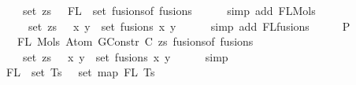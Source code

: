 \begin{isabellebody}
\ \ \ \ \ set\ zs\ {\isasymunion}\ {\isasymUnion}\ {\isacharparenleft}{\kern0pt}FL\ {\isacharbackquote}{\kern0pt}\ set\ {\isacharparenleft}{\kern0pt}fusions{\isacharunderscore}{\kern0pt}of\ fusions{\isacharparenright}{\kern0pt}{\isacharparenright}{\kern0pt}{\isachardoublequoteclose}\isanewline
\ \ \ \ \isamarkupfalse%
\ {\isacharparenleft}{\kern0pt}simp\ add{\isacharcolon}{\kern0pt}\ FL{\isacharunderscore}{\kern0pt}Mols{}{\isacharparenright}{\kern0pt}\isanewline
\ \ \isamarkupfalse%
\ \isamarkupfalse%
\isanewline
\ \ \ \ {\isachardoublequoteopen}{\isachardot}{\kern0pt}{\isachardot}{\kern0pt}{\isachardot}{\kern0pt}\ {\isacharequal}{\kern0pt}\ set\ zs\ {\isasymunion}\ {\isacharparenleft}{\kern0pt}{\isasymUnion}\ {\isacharparenleft}{\kern0pt}x{\isacharcomma}{\kern0pt}\ y{\isacharparenright}{\kern0pt}\ {\isasymin}\ set\ fusions{\isachardot}{\kern0pt}\ {\isacharbraceleft}{\kern0pt}x{\isacharcomma}{\kern0pt}\ y{\isacharbraceright}{\kern0pt}{\isacharparenright}{\kern0pt}{\isachardoublequoteclose}\isanewline
\ \ \ \ \isamarkupfalse%
\ {\isacharparenleft}{\kern0pt}simp\ add{\isacharcolon}{\kern0pt}\ FL{\isacharunderscore}{\kern0pt}fusions{\isacharparenright}{\kern0pt}\isanewline
\ \ \isamarkupfalse%
\ \isamarkupfalse%
\ P{}{}{\isacharcolon}{\kern0pt}\isanewline
\ \ \ \ {\isachardoublequoteopen}FL\ {\isacharparenleft}{\kern0pt}Mols{}\ {\isacharparenleft}{\kern0pt}Atom\ {\isacharparenleft}{\kern0pt}GConstr\ C{\isacharparenright}{\kern0pt}\ zs{\isacharparenright}{\kern0pt}\ {\isacharparenleft}{\kern0pt}fusions{\isacharunderscore}{\kern0pt}of\ fusions{\isacharparenright}{\kern0pt}{\isacharparenright}{\kern0pt}\ {\isacharequal}{\kern0pt}\isanewline
\ \ \ \ \ set\ zs\ {\isasymunion}\ {\isacharparenleft}{\kern0pt}{\isasymUnion}\ {\isacharparenleft}{\kern0pt}x{\isacharcomma}{\kern0pt}\ y{\isacharparenright}{\kern0pt}\ {\isasymin}\ set\ fusions{\isachardot}{\kern0pt}\ {\isacharbraceleft}{\kern0pt}x{\isacharcomma}{\kern0pt}\ y{\isacharbraceright}{\kern0pt}{\isacharparenright}{\kern0pt}{\isachardoublequoteclose}\isanewline
\ \ \ \ \isamarkupfalse%
\ simp\isanewline
\isanewline
\ \ \isamarkupfalse%
\ {\isachardoublequoteopen}{\isasymUnion}\ {\isacharparenleft}{\kern0pt}FL\ {\isacharbackquote}{\kern0pt}\ set\ Ts{\isacharparenright}{\kern0pt}\ {\isacharequal}{\kern0pt}\ {\isasymUnion}\ {\isacharparenleft}{\kern0pt}set\ {\isacharparenleft}{\kern0pt}map\ FL\ Ts{\isacharparenright}{\kern0pt}{\isacharparenright}{\kern0pt}{\isachardoublequoteclose}\isanewline

\end{isabellebody}
